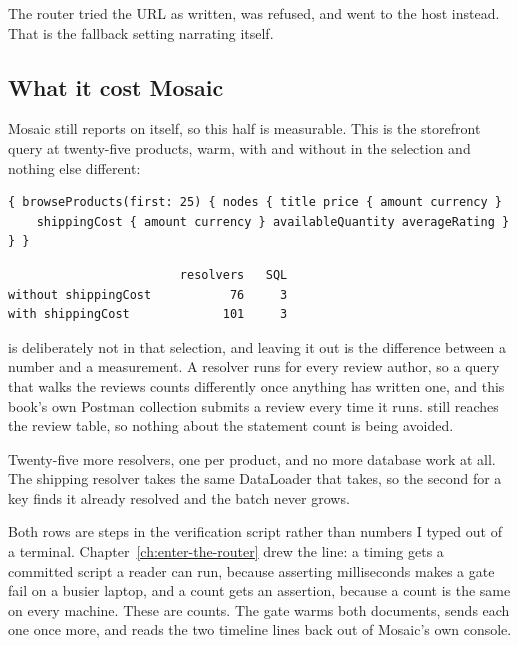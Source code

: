 The router tried the URL as written, was refused, and went to the host instead.
That is the fallback setting narrating itself.

\subsection*{What it cost Mosaic}

%
Mosaic still reports on itself, so this half is measurable. This is the
storefront query at twenty-five products, warm, with and without
 in the selection and nothing else different:

\begin{verbatim}
{ browseProducts(first: 25) { nodes { title price { amount currency }
    shippingCost { amount currency } availableQuantity averageRating } } }
\end{verbatim}

\begin{verbatim}
                        resolvers   SQL
without shippingCost           76     3
with shippingCost             101     3
\end{verbatim}

 is deliberately not in that selection, and leaving it
out is the difference between a number and a measurement. A resolver runs for
every review author, so a query that walks the reviews counts differently once
anything has written one, and this book's own Postman collection submits a
review every time it runs.  still reaches the review table,
so nothing about the statement count is being avoided.

Twenty-five more resolvers, one per product, and no more database work at all.
The shipping resolver takes the same DataLoader that  takes, so the
second  for a key finds it already resolved and the batch never
grows.

%
Both rows are steps in the verification script rather than numbers I typed out
of a terminal. Chapter~\ref{ch:enter-the-router} drew the line: a timing gets a
committed script a reader can run, because asserting milliseconds makes a gate
fail on a busier laptop, and a count gets an assertion, because a count is the
same on every machine. These are counts. The gate warms both documents, sends
each one once more, and reads the two timeline lines back out of Mosaic's own
console.

